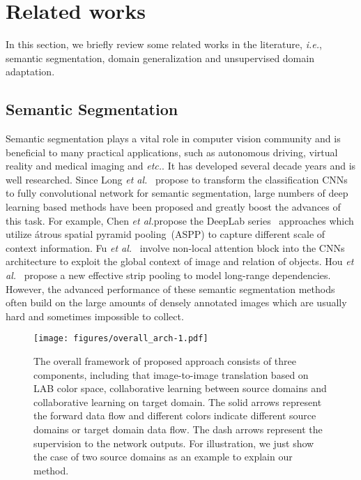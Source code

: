 \documentclass[final]{cvpr}
\def\etal{\textit{et al.}}
\def\etc{\textit{etc.}}
\begin{document}
\section{Related works}
In this section, we briefly review some related works in the literature, \textit{i.e.}, semantic segmentation, domain generalization and unsupervised domain adaptation.

\subsection{Semantic Segmentation}
Semantic segmentation plays a vital role in computer vision community and is beneficial to many practical applications, such as autonomous driving, virtual reality and medical imaging and \etc. It has developed several decade years and is well researched. Since Long \etal~\cite{long2015fully} propose to transform the classification CNNs to fully convolutional network for semantic segmentation, large numbers of deep learning based methods have been proposed and greatly boost the advances of this task. For example, Chen \etal propose the DeepLab series~\cite{chen2017deeplab,chen2018encoder} approaches which utilize \'atrous spatial pyramid pooling~(ASPP) to capture different scale of context information. Fu \etal~\cite{fu2019dual} involve non-local attention block into the CNNs architecture to exploit the global context of image and relation of objects. Hou \etal~\cite{Hou_2020_CVPR} propose a new effective strip pooling to model long-range dependencies. However, the advanced performance of these semantic segmentation methods often build on the large amounts of densely annotated images which are usually hard and sometimes impossible to collect. 

\begin{figure*}[t]
	\begin{center}
\texttt{[image: figures/overall\_arch-1.pdf]}
	\end{center}
\vspace{-6pt}
\caption{The overall framework of proposed approach consists of three components, including that image-to-image translation based on LAB color space, collaborative learning between source domains and collaborative learning on target domain. The solid arrows represent the forward data flow and different colors indicate different source domains or target domain data flow. The dash arrows represent the supervision to the network outputs. For illustration, we just show the case of two source domains as an example to explain our method.}
	\label{fig:overall_arch}
	\vspace{-10pt}
\end{figure*}
\end{document}

